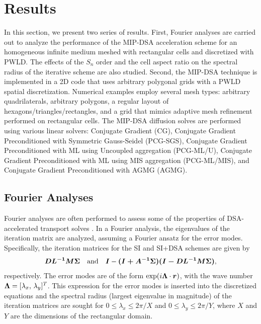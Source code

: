 \section{Results} \label{sec_res}

In this section, we present two series of results. First, Fourier analyses are 
carried out to analyze the performance of the MIP-DSA acceleration scheme 
for an homogeneous infinite medium meshed with rectangular cells and discretized with PWLD.
The effects of the $S_n$ order and the cell aspect ratio on the spectral radius of the iterative 
scheme are also studied. Second, the MIP-DSA technique is implemented in a 2D \sn code that uses
arbitrary polygonal grids with a PWLD spatial discretization.  Numerical examples employ
several mesh types: arbitrary quadrilaterals, arbitrary polygons, a regular layout of 
hexagons/triangles/rectangles, and a grid that mimics adaptive mesh refinement 
performed on rectangular cells. The MIP-DSA diffusion solves are performed using various
linear solvers: Conjugate Gradient (CG), Conjugate Gradient
Preconditioned with Symmetric Gauss-Seidel (PCG-SGS), Conjugate Gradient
Preconditioned with ML using Uncoupled aggregation (PCG-ML/U),
Conjugate Gradient Preconditioned with ML using MIS aggregation (PCG-ML/MIS),
and Conjugate Gradient Preconditioned with AGMG (AGMG). 

\subsection{Fourier Analyses}

Fourier analyses are often performed to assess some of the properties of 
DSA-accelerated transport solves \cite{dsa_ref,larsen_dsa,consistent_p1}. In a Fourier analysis,
the eigenvalues of the iteration matrix are analyzed, assuming a Fourier ansatz for the 
error modes. Specifically, the iteration matrices for the SI and SI+DSA schemes are given by
\begin{equation}
\boldsymbol{D L^{-1}M \Sigma} \quad \text{and} \quad \boldsymbol{I}-\boldsymbol{(I+A^{-1}\Sigma)(I-D L^{-1}M \Sigma)},
\end{equation}
respectively.  The error modes are of the form $\exp(i \boldsymbol{\Lambda} \cdot \boldsymbol{r})$, with the
wave number $\boldsymbol{\Lambda}=[\lambda_x,\, \lambda_y]^T$. This expression for the error modes 
is inserted into the discretized equations and the spectral radius (largest eigenvalue in magnitude)
of the iteration matrices are sought for $0 \le \lambda_x \le 2\pi/X$ and $0 \le \lambda_y \le 2\pi/Y$,
where $X$ and $Y$ are the dimensions of the rectangular domain.


